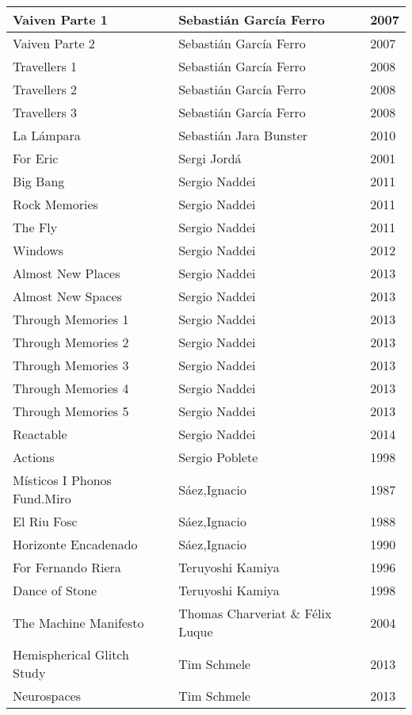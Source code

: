 \begin{center}
\begin{longtable}{ p{}  p{}  p{} }
Vaiven Parte 1 & Sebastián García Ferro & 2007 \\ \midrule 
Vaiven Parte 2 & Sebastián García Ferro & 2007 \\ \midrule 
Travellers 1 & Sebastián García Ferro & 2008 \\ \midrule 
Travellers 2 & Sebastián García Ferro & 2008 \\ \midrule 
Travellers 3 & Sebastián García Ferro & 2008 \\ \midrule 
La Lámpara & Sebastián Jara Bunster & 2010 \\ \midrule 
For Eric & Sergi Jordá & 2001 \\ \midrule 
Big Bang & Sergio Naddei & 2011 \\ \midrule 
Rock Memories & Sergio Naddei & 2011 \\ \midrule 
The Fly & Sergio Naddei & 2011 \\ \midrule 
Windows & Sergio Naddei & 2012 \\ \midrule 
Almost New Places & Sergio Naddei & 2013 \\ \midrule 
Almost New Spaces & Sergio Naddei & 2013 \\ \midrule 
Through Memories 1 & Sergio Naddei & 2013 \\ \midrule 
Through Memories 2 & Sergio Naddei & 2013 \\ \midrule 
Through Memories 3 & Sergio Naddei & 2013 \\ \midrule 
Through Memories 4 & Sergio Naddei & 2013 \\ \midrule 
Through Memories 5 & Sergio Naddei & 2013 \\ \midrule 
Reactable & Sergio Naddei & 2014 \\ \midrule 
Actions & Sergio Poblete & 1998 \\ \midrule 
Místicos I Phonos Fund.Miro & Sáez,Ignacio & 1987 \\ \midrule 
El Riu Fosc & Sáez,Ignacio & 1988 \\ \midrule 
Horizonte Encadenado & Sáez,Ignacio & 1990 \\ \midrule 
For Fernando Riera & Teruyoshi Kamiya & 1996 \\ \midrule 
Dance of Stone & Teruyoshi Kamiya & 1998 \\ \midrule 
The Machine Manifesto & Thomas Charveriat \& Félix Luque & 2004 \\ \midrule 
Hemispherical Glitch Study & Tim Schmele & 2013 \\ \midrule 
Neurospaces & Tim Schmele & 2013 \\ \midrule 

\end{longtable}
\end{center}
